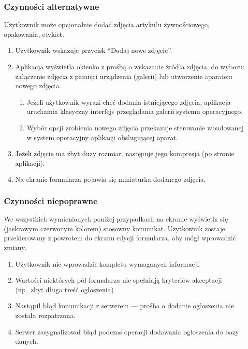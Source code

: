\documentclass[licencjacka]{pracamgr}
\begin{document}
    \subsubsection{Czynności alternatywne}
    Użytkownik może opcjonalnie dodać zdjęcia artykułu żywnościowego, opakowania, etykiet.
    \begin{enumerate}
        \item Użytkownik wskazuje przycisk ``Dodaj nowe zdjęcie''.
        \item Aplikacja wyświetla okienko z prośbą o wskazanie źródła zdjęcia, do wyboru: załączenie zdjęcia z pamięci urządzenia (galerii)
        lub utworzenie aparatem nowego zdjęcia.
        \begin{enumerate}
            \item Jeżeli użytkownik wyrazi chęć dodania istniejącego zdjęcia, aplikacja uruchamia klasyczny interfejs przeglądania galerii
            systemu operacyjnego.
            \item Wybór opcji zrobienia nowego zdjęcia przekazuje sterowanie wbudowanej w system operacyjny aplikacji obsługującej aparat.
        \end{enumerate}
        \item Jeżeli zdjęcie ma zbyt duży rozmiar, następuje jego kompresja (po stronie aplikacji).
        \item Na ekranie formularza pojawia się miniaturka dodanego zdjęcia.
    \end{enumerate}
    \subsubsection{Czynności niepoprawne}
    We wszystkich wymienionych poniżej przypadkach na ekranie wyświetla się (jaskrawym czerwonym kolorem) stosowny komunikat. Użytkownik zostaje
    przekierowany z powrotem do ekranu edycji formularza, aby mógł wprowadzić zmiany.
    \begin{enumerate}
        \item Użytkownik nie wprowadził kompletu wymaganych informacji.
        \item Wartości niektórych pól formularza nie spełniają kryteriów akceptacji (np.\ zbyt długa treść ogłoszenia)
        \item Nastąpił błąd komunikacji z serwerem --- prośba o dodanie ogłoszenia nie została rozpatrzona.
        \item Serwer zasygnalizował błąd podczas operacji dodawania ogłoszenia do bazy danych.
    \end{enumerate}
\end{document}
